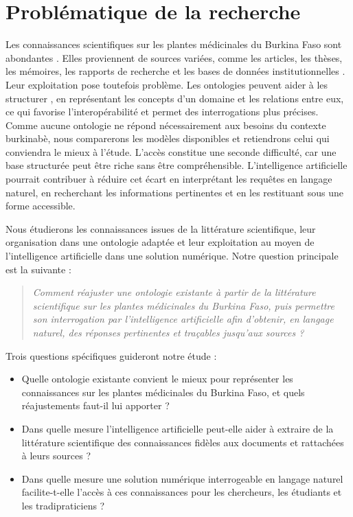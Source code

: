 \section*{Problématique de la recherche}

Les connaissances scientifiques sur les plantes médicinales du Burkina Faso sont abondantes \cite{ouedraogo_revue_2024}. Elles proviennent de sources variées, comme les articles, les thèses, les mémoires, les rapports de recherche et les bases de données institutionnelles \cite{zizka_traditional_2015}. Leur exploitation pose toutefois problème. Les ontologies peuvent aider à les structurer \cite{shojaee-mend_development_2019}, en représentant les concepts d'un domaine et les relations entre eux, ce qui favorise l'interopérabilité et permet des interrogations plus précises. Comme aucune ontologie ne répond nécessairement aux besoins du contexte burkinabè, nous comparerons les modèles disponibles et retiendrons celui qui conviendra le mieux à l'étude. L'accès constitue une seconde difficulté, car une base structurée peut être riche sans être compréhensible. L'intelligence artificielle pourrait contribuer à réduire cet écart \cite{neha_retrieval-augmented_2025} en interprétant les requêtes en langage naturel, en recherchant les informations pertinentes et en les restituant sous une forme accessible.

Nous étudierons les connaissances issues de la littérature scientifique, leur organisation dans une ontologie adaptée et leur exploitation au moyen de l'intelligence artificielle dans une solution numérique. Notre question principale est la suivante :

\begin{quote}
\textit{Comment réajuster une ontologie existante à partir de la littérature scientifique sur les plantes médicinales du Burkina Faso, puis permettre son interrogation par l'intelligence artificielle afin d'obtenir, en langage naturel, des réponses pertinentes et traçables jusqu'aux sources ?}
\end{quote}

Trois questions spécifiques guideront notre étude :

\begin{itemize}
\item Quelle ontologie existante convient le mieux pour représenter les connaissances sur les plantes médicinales du Burkina Faso, et quels réajustements faut-il lui apporter ?
\item Dans quelle mesure l'intelligence artificielle peut-elle aider à extraire de la littérature scientifique des connaissances fidèles aux documents et rattachées à leurs sources ?
\item Dans quelle mesure une solution numérique interrogeable en langage naturel facilite-t-elle l'accès à ces connaissances pour les chercheurs, les étudiants et les tradipraticiens ?
\end{itemize}

